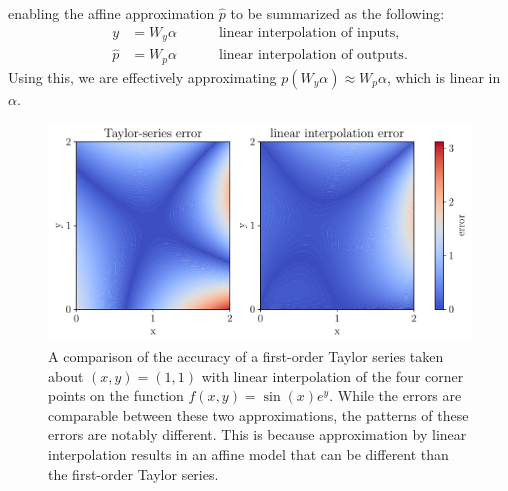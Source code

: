 enabling the affine approximation $\hat{p}$ to be summarized as the following:
\begin{align}
    y &= W_y \alpha \quad \quad \quad  \text{linear interpolation of inputs,}\\ 
    \hat{p} &= W_p \alpha \quad \quad \quad  \text{linear interpolation of outputs.}\label{btb:blend1}
\end{align}
Using this, we are effectively approximating $p(W_y\alpha) \approx W_p\alpha$, which is linear in $\alpha$.

\begin{figure}
    \centering
    \includegraphics[width=0.9\linewidth]{bundles/interp_fig.pdf}
    \caption{A comparison of the accuracy of a first-order Taylor series taken about $(x,y)=(1,1)$ with linear interpolation of the four corner points on the function $f(x,y) = \sin(x)e^{y}$. While the errors are comparable between these two approximations, the patterns of these errors are notably different. This is because approximation by linear interpolation results in an affine model that can be different than the first-order Taylor series.}
    \label{fig:btb:interp}
\end{figure}



